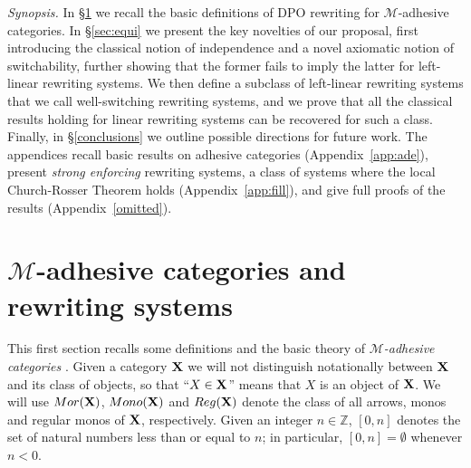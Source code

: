 \documentclass[a4paper,UKenglish,cleveref,pdftex,thm-restate,numberwithinsect]{lipics-v2021}
\newcommand{\mor}{\mathsf{Mor}}
\newcommand{\mon}{\mathsf{Mono}}
\newcommand{\reg}{\mathsf{Reg}}
\def\X{\textbf {\textup{X}}}
\def\Set{\textbf {\textup{Set}}}
\newtheorem*{notation}{Notation}
\begin{document}
\emph{Synopsis.}
In \S\ref{sec:ade} we recall the basic 
definitions of DPO rewriting for $\mathcal{M}$-adhesive categories. 
In \S\ref{sec:equi} we present the key novelties of our proposal,
first introducing the classical notion of independence and 
a novel axiomatic notion of switchability, further showing that the
former fails to imply the latter for left-linear rewriting systems.
We then define a subclass of left-linear rewriting systems
that we call well-switching rewriting systems,
and we prove that all the classical results holding for linear rewriting systems
can be recovered for such a class.
Finally, in \S\ref{conclusions} we outline possible directions for future work.
%
The appendices
recall basic results on adhesive categories (Appendix~\ref{app:ade}),
present \emph{strong enforcing} rewriting systems, a class of systems
where the local Church-Rosser Theorem holds (Appendix~\ref{app:fill}),
and give full proofs of the results
(Appendix~\ref{omitted}).

\section{$\mathcal{M}$-adhesive categories and rewriting systems}\label{sec:ade}
This first section recalls some definitions and the basic theory of \emph{$\mathcal{M}$-adhesive categories} \cite{azzi2019essence,ehrig2012,ehrig2014adhesive,lack2005adhesive,heindel2009category}.
%
Given a category $\X$ we will not distinguish
notationally between $\X$ and its class of objects, so that
``$X\in \X$'' means that $X$ is an object of $\X$.
We will use $\mor(\X)$, $\mon(\X)$ and $\reg(\X)$ denote the class of
all arrows, monos and regular monos of $\X$, respectively.  Given an
integer $n\in \mathbb{Z}$, $[0,n]$ denotes the set of natural numbers
less than or equal to $n$; in particular, $[0,n]=\emptyset$ whenever
$n<0$.


\end{document}

